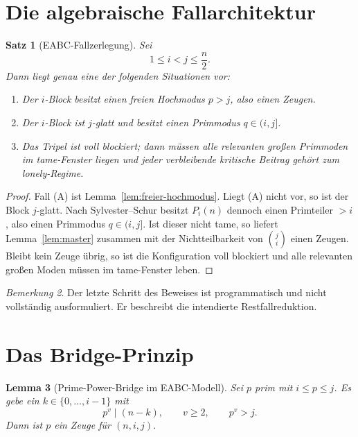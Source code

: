 \documentclass[12pt,a4paper]{article}
\theoremstyle{plain}
\newtheorem{theorem}{Satz}[section]
\newtheorem{lemma}[theorem]{Lemma}
\theoremstyle{definition}
\theoremstyle{remark}
\newtheorem{remark}[theorem]{Bemerkung}
\begin{document}
	\section{Die algebraische Fallarchitektur}
	
	\begin{theorem}[EABC-Fallzerlegung]
		\label{thm:fallzerlegung}
		Sei
		\[
		1\le i<j\le \frac{n}{2}.
		\]
		Dann liegt genau eine der folgenden Situationen vor:
		\begin{enumerate}[label=\textup{(\Alph*)}]
			\item Der \(i\)-Block besitzt einen freien Hochmodus \(p>j\), also einen Zeugen.
			\item Der \(i\)-Block ist \(j\)-glatt und besitzt einen Primmodus \(q\in(i,j]\).
			\item Das Tripel ist voll blockiert; dann müssen alle relevanten großen Primmoden im tame-Fenster liegen und jeder verbleibende kritische Beitrag gehört zum lonely-Regime.
		\end{enumerate}
	\end{theorem}
	
	\begin{proof}
		Fall (A) ist Lemma~\ref{lem:freier-hochmodus}. Liegt (A) nicht vor, so ist der Block \(j\)-glatt. Nach Sylvester--Schur besitzt \(P_i(n)\) dennoch einen Primteiler \(>i\), also einen Primmodus \(q\in(i,j]\). Ist dieser nicht tame, so liefert Lemma~\ref{lem:master} zusammen mit der Nichtteilbarkeit von \(\binom{j}{i}\) einen Zeugen. Bleibt kein Zeuge übrig, so ist die Konfiguration voll blockiert und alle relevanten großen Moden müssen im tame-Fenster leben.
	\end{proof}
	
	\begin{remark}
		Der letzte Schritt des Beweises ist programmatisch und nicht vollständig ausformuliert. Er beschreibt die intendierte Restfallreduktion.
	\end{remark}
	
	\section{Das Bridge-Prinzip}
	
	\begin{lemma}[Prime-Power-Bridge im EABC-Modell]
		\label{lem:bridge}
		Sei \(p\) prim mit \(i\le p\le j\). Es gebe ein \(k\in\{0,\dots,i-1\}\) mit
		\[
		p^v\mid (n-k),\qquad v\ge2,\qquad p^v>j.
		\]
		Dann ist \(p\) ein Zeuge für \((n,i,j)\).
	\end{lemma}
	
\end{document}
